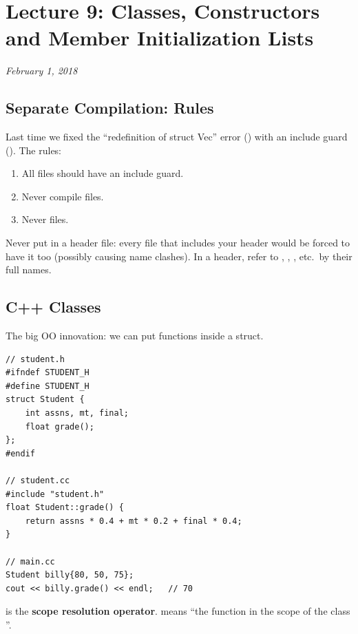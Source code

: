 \chapter{Lecture 9: Classes, Constructors and Member Initialization Lists}
\begin{center}
\textit{February 1, 2018}
\end{center}

\section{Separate Compilation: Rules}
Last time we fixed the ``redefinition of struct Vec'' error
() with an include guard
(). The rules:
\begin{enumerate}
  \item All  files should have an include guard.
  \item Never compile  files.
  \item Never   files.
\end{enumerate}

\begin{important}
Never put  in a header file: every file that includes
your header would be forced to have it too (possibly causing name clashes). In a
header, refer to , , ,
etc.\ by their full names.
\end{important}

\section{C++ Classes}
The big OO innovation: we can put functions inside a struct.

\begin{lstlisting}[style=cpp]
// student.h
#ifndef STUDENT_H
#define STUDENT_H
struct Student {
    int assns, mt, final;
    float grade();
};
#endif

// student.cc
#include "student.h"
float Student::grade() {
    return assns * 0.4 + mt * 0.2 + final * 0.4;
}

// main.cc
Student billy{80, 50, 75};
cout << billy.grade() << endl;   // 70
\end{lstlisting}

\code{::} is the \textbf{scope resolution operator}.  means
``the function  in the scope of the class ''.

